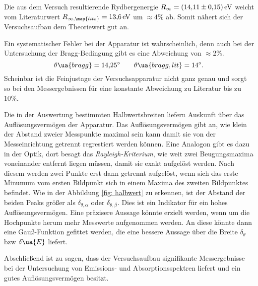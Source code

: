 Die aus dem Versuch resultierende Rydbergenergie $R_\infty=\SI{14.11\pm0.15}{\eV}$ weicht vom Literaturwert \cite{anleitung602} %
$R_{\infty,\map{lits}}=\SI{13.6}{\eV}$ um $\approx 4 \%$ ab. Somit nähert sich der
Versuchsaufbau dem Theoriewert gut an.

Ein systematischer Fehler bei der Apparatur ist wahrscheinlich, denn auch bei der %
Untersuchung der Bragg-Bedingung gibt es eine Abweichung von $\approx 2\%$.
\begin{equation*}
  \theta\ua{bragg}=\SI{14.25}{\degree}  \qquad \theta\ua{bragg,lit}=\SI{14}{\degree}.
\end{equation*}
Scheinbar ist die Feinjustage der Versuchsapparatur nicht ganz genau und sorgt so bei den Messergebnissen
für eine konstante Abweichung zu Literatur bis zu $10\%$.

Die in der Auswertung bestimmten Halbwertsbreiten liefern Auskunft über das
Auflösungsvermögen der Apparatur. %
Das Auflösungsvermögen gibt an, wie klein der Abstand zweier Messpunkte maximal sein kann damit sie von der Messeinrichtung
getrennt regrestiert werden können.
Eine Analogon gibt es dazu in der Optik, dort besagt das \emph{Rayleigh-Kriterium},
wie weit zwei Beugungsmaxima voneinander entfernt liegen müssen, damit sie exakt aufgelöst werden.
Nach diesem werden zwei Punkte erst dann getrennt aufgelöst, wenn sich das erste Minumum vom ersten Bildpunkt
sich in einem Maxima des zweiten Bildpunktes befindet.
Wie in der Abbildung \ref{fig: halbwert} zu erkennen, ist der Abstand der beiden Peaks
größer als $\delta_{\theta,\alpha}$ oder $\delta_{\theta,\beta}$. Dies ist ein Indikator
für ein hohes Auflösungsvermögen. Eine präzisere Aussage könnte erzielt werden,
wenn um die Hochpunkte herum mehr Messwerte aufgenommen werden. An diese
könnte dann eine Gauß-Funktion gefittet werden, die eine bessere Aussage über die
Breite $\delta_\theta$ bzw $\delta\ua{E}$ liefert.

Abschließend ist zu sagen, dass der Versuchsaufbau signifikante Messergebnisse
bei der Untersuchung von Emissions- und Absorptionsspektren liefert und ein
gutes Auflösungsvermögen besitzt.
